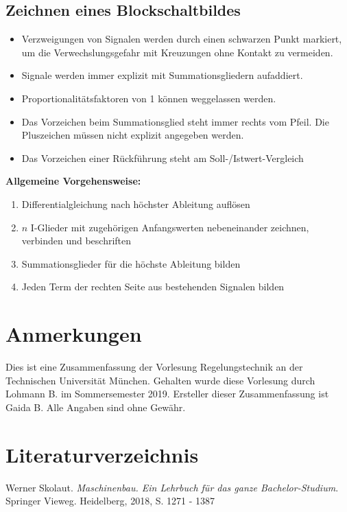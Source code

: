 \documentclass[10pt,a4paper]{article}
\begin{document}
\subsection{Zeichnen eines Blockschaltbildes}
\begin{itemize}
	\item Verzweigungen von Signalen werden durch einen schwarzen Punkt markiert, um die Verwechslungsgefahr mit Kreuzungen ohne Kontakt zu vermeiden.
	\item Signale werden immer explizit mit Summationsgliedern aufaddiert.
	\item Proportionalitätsfaktoren von 1 können weggelassen werden.
	\item Das Vorzeichen beim Summationsglied steht immer rechts vom Pfeil. Die Pluszeichen müssen nicht explizit angegeben werden.
	\item Das Vorzeichen einer Rückführung steht am Soll-/Istwert-Vergleich
\end{itemize}
\textbf{Allgemeine Vorgehensweise:}
\begin{enumerate}
	\item Differentialgleichung nach höchster Ableitung auflösen
	\item $n$ I-Glieder mit zugehörigen Anfangswerten nebeneinander zeichnen, verbinden und beschriften
	\item Summationsglieder für die höchste Ableitung bilden
	\item Jeden Term der rechten Seite aus bestehenden Signalen bilden
\end{enumerate}






\pagebreak
\section*{Anmerkungen}
Dies ist eine Zusammenfassung der Vorlesung Regelungstechnik an der Technischen Universität München.
Gehalten wurde diese Vorlesung durch Lohmann B. im Sommersemester 2019.
Ersteller dieser Zusammenfassung ist Gaida B.
Alle Angaben sind ohne Gewähr.


\section*{Literaturverzeichnis}
Werner Skolaut. \textit{Maschinenbau. Ein Lehrbuch für das ganze Bachelor-Studium}. Springer Vieweg. Heidelberg, 2018, S. 1271 - 1387
\end{document}
